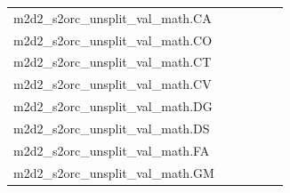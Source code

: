 \documentclass[dvipsnames]{article}
\begin{document}
\begin{appendix}
{\begin{longtable}{m{6cm}m{1.7cm}m{1.7cm}m{1.7cm}m{1.7cm}m{1.7cm}}
	m2d2\_s2orc\_unsplit\_val\_math.CA  & \colorbox[HTML]{77c578}{\makebox[\mywidth][c]{9.18}} & \colorbox[HTML]{e5f4ab}{\makebox[\mywidth][c]{9.49}} & \colorbox[HTML]{ffffe5}{\makebox[\mywidth][c]{11.01}} & \colorbox[HTML]{c8e89a}{\makebox[\mywidth][c]{9.36}} & \colorbox[HTML]{b2df90}{\makebox[\mywidth][c]{9.30}}\\
	m2d2\_s2orc\_unsplit\_val\_math.CO  & \colorbox[HTML]{77c578}{\makebox[\mywidth][c]{6.99}} & \colorbox[HTML]{edf8b2}{\makebox[\mywidth][c]{7.33}} & \colorbox[HTML]{ffffe5}{\makebox[\mywidth][c]{8.69}} & \colorbox[HTML]{d8efa2}{\makebox[\mywidth][c]{7.21}} & \colorbox[HTML]{acdc8d}{\makebox[\mywidth][c]{7.08}}\\
	m2d2\_s2orc\_unsplit\_val\_math.CT  & \colorbox[HTML]{77c578}{\makebox[\mywidth][c]{9.78}} & \colorbox[HTML]{e9f6af}{\makebox[\mywidth][c]{10.20}} & \colorbox[HTML]{ffffe5}{\makebox[\mywidth][c]{12.04}} & \colorbox[HTML]{dff2a7}{\makebox[\mywidth][c]{10.12}} & \colorbox[HTML]{aadc8d}{\makebox[\mywidth][c]{9.91}}\\
	m2d2\_s2orc\_unsplit\_val\_math.CV  & \colorbox[HTML]{77c578}{\makebox[\mywidth][c]{7.81}} & \colorbox[HTML]{e5f4ab}{\makebox[\mywidth][c]{8.07}} & \colorbox[HTML]{ffffe5}{\makebox[\mywidth][c]{9.36}} & \colorbox[HTML]{d0ec9e}{\makebox[\mywidth][c]{7.99}} & \colorbox[HTML]{9ad486}{\makebox[\mywidth][c]{7.87}}\\
	m2d2\_s2orc\_unsplit\_val\_math.DG  & \colorbox[HTML]{77c578}{\makebox[\mywidth][c]{7.96}} & \colorbox[HTML]{def2a6}{\makebox[\mywidth][c]{8.18}} & \colorbox[HTML]{ffffe5}{\makebox[\mywidth][c]{9.50}} & \colorbox[HTML]{bae294}{\makebox[\mywidth][c]{8.08}} & \colorbox[HTML]{81c97c}{\makebox[\mywidth][c]{7.98}}\\
	m2d2\_s2orc\_unsplit\_val\_math.DS  & \colorbox[HTML]{77c578}{\makebox[\mywidth][c]{7.88}} & \colorbox[HTML]{dcf1a5}{\makebox[\mywidth][c]{8.12}} & \colorbox[HTML]{ffffe5}{\makebox[\mywidth][c]{9.61}} & \colorbox[HTML]{d3eda0}{\makebox[\mywidth][c]{8.08}} & \colorbox[HTML]{a4d98a}{\makebox[\mywidth][c]{7.96}}\\
	m2d2\_s2orc\_unsplit\_val\_math.FA  & \colorbox[HTML]{77c578}{\makebox[\mywidth][c]{7.71}} & \colorbox[HTML]{e1f3a9}{\makebox[\mywidth][c]{7.96}} & \colorbox[HTML]{ffffe5}{\makebox[\mywidth][c]{9.35}} & \colorbox[HTML]{cae99c}{\makebox[\mywidth][c]{7.88}} & \colorbox[HTML]{b0de8f}{\makebox[\mywidth][c]{7.81}}\\
	m2d2\_s2orc\_unsplit\_val\_math.GM  & \colorbox[HTML]{77c578}{\makebox[\mywidth][c]{7.85}} & \colorbox[HTML]{e6f5ad}{\makebox[\mywidth][c]{8.15}} & \colorbox[HTML]{ffffe5}{\makebox[\mywidth][c]{9.57}} & \colorbox[HTML]{d7efa2}{\makebox[\mywidth][c]{8.07}} & \colorbox[HTML]{a5d98b}{\makebox[\mywidth][c]{7.93}}\\

\end{longtable}}
\end{appendix}
\end{document}
